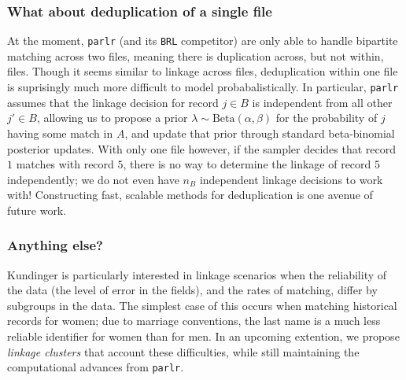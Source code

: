 \documentclass[
  12pt,
]{article}
\begin{document}
\hypertarget{what-about-deduplication-of-a-single-file}{%
\subsubsection{What about deduplication of a single
file}\label{what-about-deduplication-of-a-single-file}}

At the moment, \texttt{parlr} (and its \texttt{BRL} competitor) are only
able to handle bipartite matching across two files, meaning there is
duplication across, but not within, files. Though it seems similar to
linkage across files, deduplication within one file is suprisingly much
more difficult to model probabalistically. In particular, \texttt{parlr}
assumes that the linkage decision for record \(j \in B\) is independent
from all other \(j' \in B\), allowing us to propose a prior
\(\lambda \sim \text{Beta}(\alpha, \beta)\) for the probability of \(j\)
having some match in \(A\), and update that prior through standard
beta-binomial posterior updates. With only one file however, if the
sampler decides that record \(1\) matches with record \(5\), there is no
way to determine the linkage of record \(5\) independently; we do not
even have \(n_B\) independent linkage decisions to work with!
Constructing fast, scalable methods for deduplication is one avenue of
future work.

\hypertarget{anything-else}{%
\subsubsection{Anything else?}\label{anything-else}}

Kundinger is particularly interested in linkage scenarios when the
reliability of the data (the level of error in the fields), and the
rates of matching, differ by subgroups in the data. The simplest case of
this occurs when matching historical records for women; due to marriage
conventions, the last name is a much less reliable identifier for women
than for men. In an upcoming extention, we propose \emph{linkage
clusters} that account these difficulties, while still maintaining the
computational advances from \texttt{parlr}.
\end{document}
